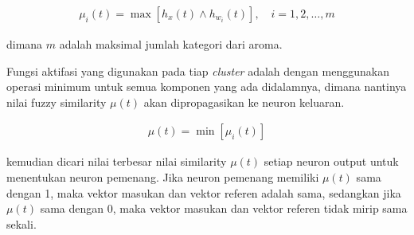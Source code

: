 \begin{align}
\mu_i(t) = \max [h_x(t) \wedge h_{w_i}(t)], \quad i = 1, 2, \dots, m
\end{align}

\noindent dimana $m$ adalah maksimal jumlah kategori dari aroma.

Fungsi aktifasi yang digunakan pada tiap \emph{cluster} adalah dengan
menggunakan operasi minimum untuk semua komponen yang ada didalamnya, 
dimana nantinya nilai fuzzy similarity $\mu(t)$ akan dipropagasikan ke neuron
keluaran.

\begin{align}
\mu(t) = \min [\mu_i(t)]
\end{align}

\noindent kemudian dicari nilai terbesar nilai similarity $\mu(t)$
setiap neuron output untuk menentukan neuron pemenang. Jika neuron pemenang
memiliki $\mu(t)$ sama dengan 1, maka vektor masukan dan vektor
referen adalah sama, sedangkan jika $\mu(t)$ sama dengan 0, maka vektor
masukan dan vektor referen tidak mirip sama sekali.

